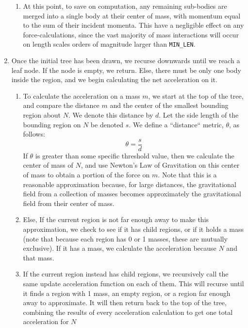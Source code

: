 \documentclass[cm, 10pt]{article}
\begin{document}
\begin{enumerate}
  \begin{enumerate}[label=\roman*)]
    \item At this point, to save on computation, any remaining
      sub-bodies are merged into a single body at their center of
      mass, with momentum equal to the sum of their incident momenta.
      This have a negligible effect on any force-calculations, since
      the vast majority of mass interactions will occur on length
      scales orders of magnitude larger than \texttt{MIN\_LEN}.
  \end{enumerate}
\item Once the initial tree has been drawn, we recurse downwards until
  we reach a leaf node. If the node is empty, we return. Else, there
  must be only one body inside the region, and we begin calculating
  the net acceleration on it.
  \begin{enumerate}[label=\roman*)]
    \item To calculate the acceleration on a mass $m$, we start at the
      top of the tree, and compare the distance $m$ and the center of
      the smallest bounding region about $N$. We denote this distance
      by $d$. Let the side length of the bounding region on $N$ be
      denoted $s$. We define a ``distance`` metric, $\theta$, as
      follows:
      \[
        \theta = \frac{s}{d}
      \]
      If $\theta$ is greater than some specific threshold value, then
      we calculate the center of mass of $N$, and use Newton's Law of
      Gravitation on this center of mass to obtain a portion of the
      force on $m$. Note that this is a reasonable approximation
      because, for large distances, the gravitational field from a
      collection of masses becomes approximately the gravitational
      field from their center of mass.
    \item Else, If the current region is not far enough away to make
      this approximation, we check to see if it has child regions, or
      if it holds a mass (note that because each region has 0 or 1
      masses, these are mutually exclusive). If it has a mass, we
      calculate the acceleration because $N$ and that mass.
    \item If the current region instead has child regions, we
      recursively call the same update acceleration function on each
      of them. This will recurse until it finds a region with 1 mass,
      an empty region, or a region far enough away to approximate. It
      will then return back to the top of the tree, combining the
      results of every acceleration calculation to get one total
      acceleration for $N$
  \end{enumerate}
\end{enumerate}
\end{document}
